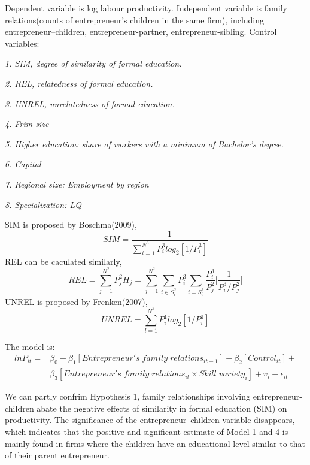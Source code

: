 \documentclass{article}
\begin{document}
    Dependent variable is log labour productivity.
    Independent variable is family relations(counts of entrepreneur's children in the same firm), including entrepreneur–children, entrepreneur-partner, entrepreneur-sibling. 
    Control variables: 
    
    \emph{1. SIM, degree of similarity of formal education.}

    \emph{2. REL, relatedness of formal education.}

    \emph{3. UNREL, unrelatedness of formal education. }

    \emph{4. Frim size}

    \emph{5. Higher education: share of workers with a minimum of Bachelor's degree.}

    \emph{6. Capital}

    \emph{7. Regional size: Employment by region}

    \emph{8. Specialization: LQ}

    SIM is proposed by Boschma(2009), 
    \begin{equation}
        SIM=\frac{1}{\sum_{i=1}^{N^3}P_i^3log_2[1/P_i^3]}
    \end{equation}
    REL can be caculated similarly, 
    \begin{equation}
        REL=\sum_{j=1}^{N^2}P_j^2H_j=\sum_{j=1}^{N^2}\sum_{i\in S_i^2}P_i^3\sum_{i=S_i^2}\frac{P_i^3}{P_j^2}\bigg[\frac{1}{P_i^3/P_j^2}\bigg]
    \end{equation}
    UNREL is proposed by Frenken(2007),
    \begin{equation}
        UNREL=\sum_{l=1}^{N^1}P_i^1log_2[1/P_i^1]
    \end{equation}

    The model is:
    \begin{equation}
        \begin{aligned}
            lnP_{it}=&\beta_0+\beta_1[Entrepreneur's\; family\; relations_{it-1}]  
            +\beta_2[Control_{it}]+\\
            &\beta_3[Entrepreneur's\; family\; relations_{it}\times Skill\; variety_i]
            +v_i+\epsilon_{it}
        \end{aligned}
    \end{equation}

    We can partly confrim Hypothesis 1, family relationships involving entrepreneur-children 
    abate the negative effects of similarity in formal education (SIM) on productivity. 
    The significance of the entrepreneur–children variable disappears, which indicates that the 
    positive and significant estimate of Model 1 and 4 is mainly found in firms where the children have an educational 
    level similar to that of their parent entrepreneur.
\end{document}
